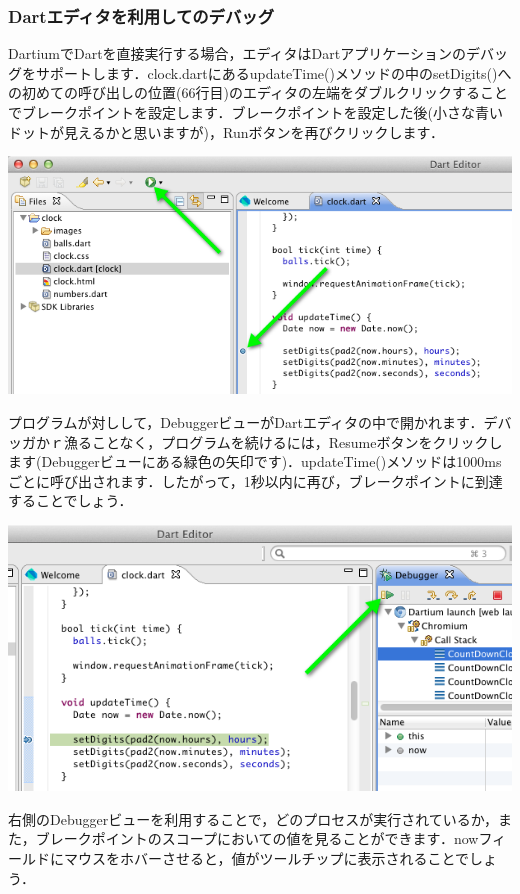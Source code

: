 \subsubsection{Dartエディタを利用してのデバッグ}

DartiumでDartを直接実行する場合，エディタはDartアプリケーションのデバッグをサポートします．clock.dartにあるupdateTime()メソッドの中のsetDigits()への初めての呼び出しの位置(66行目)のエディタの左端をダブルクリックすることでブレークポイントを設定します．ブレークポイントを設定した後(小さな青いドットが見えるかと思いますが)，Runボタンを再びクリックします．

\includegraphics{step1/debug_img1.png}

プログラムが対しして，DebuggerビューがDartエディタの中で開かれます．デバッガかｒ漁ることなく，プログラムを続けるには，Resumeボタンをクリックします(Debuggerビューにある緑色の矢印です)．updateTime()メソッドは1000msごとに呼び出されます．したがって，1秒以内に再び，ブレークポイントに到達することでしょう．

\includegraphics{step1/debug_img2.png}

右側のDebuggerビューを利用することで，どのプロセスが実行されているか，また，ブレークポイントのスコープにおいての値を見ることができます．nowフィールドにマウスをホバーさせると，値がツールチップに表示されることでしょう．


